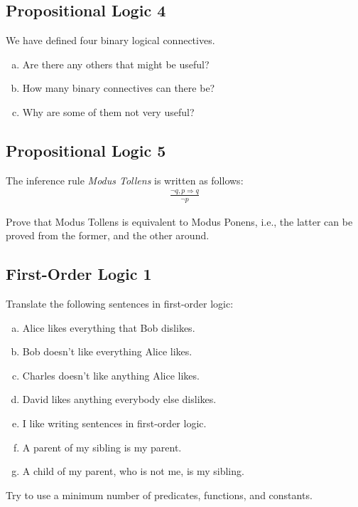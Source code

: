 \documentclass[11pt, answers]{exam}
\begin{document}
%
%
\begin{questions}
\section{Propositional Logic 4}
\question

We have defined four binary logical connectives.

\begin{enumerate}[a.]
	\item Are there any others that might be useful?
	\item How many binary connectives can there be?
	\item Why are some of them not very useful?
\end{enumerate}

\end{questions}


%
%
\begin{questions}
\section{Propositional Logic 5}
\question

The inference rule \textit{Modus Tollens} is written as follows:
\begin{align*}
	\frac{\neg q, p \Rightarrow q}{\neg p}
\end{align*}

Prove that Modus Tollens is equivalent to Modus Ponens, i.e., the latter can be proved from the former, and the other around.

\end{questions}

%
%
\begin{questions}
\section{First-Order Logic 1}
\question

Translate the following sentences in first-order logic:

\begin{enumerate}[a.]
\item Alice likes everything that Bob dislikes.
\item Bob doesn't like everything Alice likes.
\item Charles doesn't like anything Alice likes.
\item David likes anything everybody else dislikes.
\item I like writing sentences in first-order logic.
\item A parent of my sibling is my parent.
\item A child of my parent, who is not me, is my sibling.
\end{enumerate}

Try to use a minimum number of predicates, functions, and constants.

\end{questions}
\end{document}
